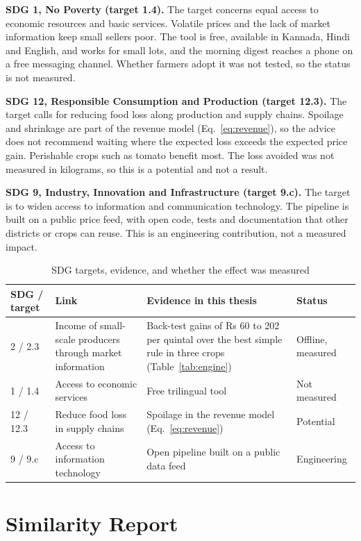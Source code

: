 \noindent\textbf{SDG 1, No Poverty (target 1.4).} The target concerns equal access to economic resources and basic services. Volatile prices and the lack of market information keep small sellers poor. The tool is free, available in Kannada, Hindi and English, and works for small lots, and the morning digest reaches a phone on a free messaging channel. Whether farmers adopt it was not tested, so the status is not measured.

\noindent\textbf{SDG 12, Responsible Consumption and Production (target 12.3).} The target calls for reducing food loss along production and supply chains. Spoilage and shrinkage are part of the revenue model (Eq.~\ref{eq:revenue}), so the advice does not recommend waiting where the expected loss exceeds the expected price gain. Perishable crops such as tomato benefit most. The loss avoided was not measured in kilograms, so this is a potential and not a result.

\noindent\textbf{SDG 9, Industry, Innovation and Infrastructure (target 9.c).} The target is to widen access to information and communication technology. The pipeline is built on a public price feed, with open code, tests and documentation that other districts or crops can reuse. This is an engineering contribution, not a measured impact.

\begin{table}[H]
\centering
\caption{SDG targets, evidence, and whether the effect was measured}
\label{tab:sdg}
\small
\begin{tabular}{|l|p{4.2cm}|p{5.4cm}|l|}
\hline
\textbf{SDG / target} & \textbf{Link} & \textbf{Evidence in this thesis} & \textbf{Status} \\ \hline
2 / 2.3 & Income of small-scale producers through market information & Back-test gains of Rs 60 to 202 per quintal over the best simple rule in three crops (Table~\ref{tab:engine}) & Offline, measured \\ \hline
1 / 1.4 & Access to economic services & Free trilingual tool & Not measured \\ \hline
12 / 12.3 & Reduce food loss in supply chains & Spoilage in the revenue model (Eq.~\ref{eq:revenue}) & Potential \\ \hline
9 / 9.c & Access to information technology & Open pipeline built on a public data feed & Engineering \\ \hline
\end{tabular}
\end{table}

\chapter{Similarity Report}
\label{appendix:similarity}

